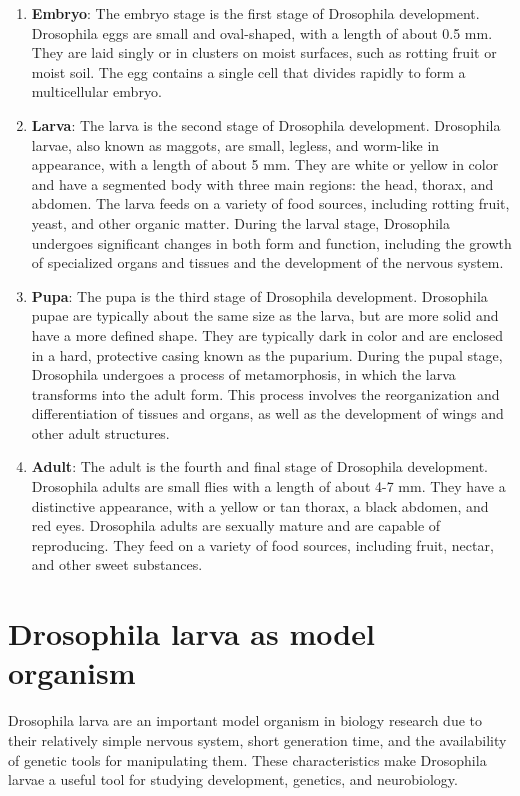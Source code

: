 \documentclass{report}
\begin{document}
	\begin{enumerate}
		\item \textbf{Embryo}: The embryo stage is the first stage of Drosophila development. Drosophila eggs are small and oval-shaped, with a length of about 0.5 mm. They are laid singly or in clusters on moist surfaces, such as rotting fruit or moist soil. The egg contains a single cell that divides rapidly to form a multicellular embryo.
		\item \textbf{Larva}: The larva is the second stage of Drosophila development. Drosophila larvae, also known as maggots, are small, legless, and worm-like in appearance, with a length of about 5 mm. They are white or yellow in color and have a segmented body with three main regions: the head, thorax, and abdomen. The larva feeds on a variety of food sources, including rotting fruit, yeast, and other organic matter. During the larval stage, Drosophila undergoes significant changes in both form and function, including the growth of specialized organs and tissues and the development of the nervous system.
		\item \textbf{Pupa}: The pupa is the third stage of Drosophila development. Drosophila pupae are typically about the same size as the larva, but are more solid and have a more defined shape. They are typically dark in color and are enclosed in a hard, protective casing known as the puparium. During the pupal stage, Drosophila undergoes a process of metamorphosis, in which the larva transforms into the adult form. This process involves the reorganization and differentiation of tissues and organs, as well as the development of wings and other adult structures.
		\item \textbf{Adult}: The adult is the fourth and final stage of Drosophila development. Drosophila adults are small flies with a length of about 4-7 mm. They have a distinctive appearance, with a yellow or tan thorax, a black abdomen, and red eyes. Drosophila adults are sexually mature and are capable of reproducing. They feed on a variety of food sources, including fruit, nectar, and other sweet substances.
	\end{enumerate}
	
	\section{Drosophila larva as model organism}
	Drosophila larva are an important model organism in biology research due to their relatively simple nervous system, short generation time, and the availability of genetic tools for manipulating them. These characteristics make Drosophila larvae a useful tool for studying development, genetics, and neurobiology.
	
\end{document}
